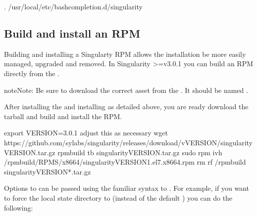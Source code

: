 \documentclass[letterpaper,10pt,english]{sphinxmanual}
\begin{document}
%
\begin{sphinxVerbatim}[commandchars=\\\{\}]
\PYGZdl{} . /usr/local/etc/bash\PYGZus{}completion.d/singularity
\end{sphinxVerbatim}


\subsection{Build and install an RPM}
\label{\detokenize{installation:build-and-install-an-rpm}}\label{\detokenize{installation:install-rpm}}
Building and installing a Singularty RPM allows the installation be more easily
managed, upgraded and removed. In Singularity \textgreater{}=v3.0.1 you can build an RPM
directly from the .

\begin{sphinxadmonition}{note}{Note:}
Be sure to download the correct asset from the .  It
should be named .
\end{sphinxadmonition}

After installing the {\hyperref[\detokenize{installation:install-dependencies}]{}} and installing
{\hyperref[\detokenize{installation:install-go}]{}} as detailed above, you are ready download the tarball and
build and install the RPM.

%
\begin{sphinxVerbatim}[commandchars=\\\{\}]
\PYGZdl{} export VERSION=3.0.1 \PYGZam{}\PYGZam{} \PYGZsh{} adjust this as necessary \PYGZbs{}
    wget https://github.com/sylabs/singularity/releases/download/v\PYGZdl{}\PYGZob{}VERSION\PYGZcb{}/singularity\PYGZhy{}\PYGZdl{}\PYGZob{}VERSION\PYGZcb{}.tar.gz \PYGZam{}\PYGZam{} \PYGZbs{}
    rpmbuild \PYGZhy{}tb singularity\PYGZhy{}\PYGZdl{}\PYGZob{}VERSION\PYGZcb{}.tar.gz \PYGZam{}\PYGZam{} \PYGZbs{}
    sudo rpm \PYGZhy{}ivh \PYGZti{}/rpmbuild/RPMS/x86\PYGZus{}64/singularity\PYGZhy{}\PYGZdl{}VERSION\PYGZhy{}1.el7.x86\PYGZus{}64.rpm \PYGZam{}\PYGZam{} \PYGZbs{}
    rm \PYGZhy{}rf \PYGZti{}/rpmbuild singularity\PYGZhy{}\PYGZdl{}VERSION*.tar.gz
\end{sphinxVerbatim}

Options to  can be passed using the familiar syntax to .
For example, if you want to force the local state directory to  (instead
of the default ) you can do the following:
\end{document}
